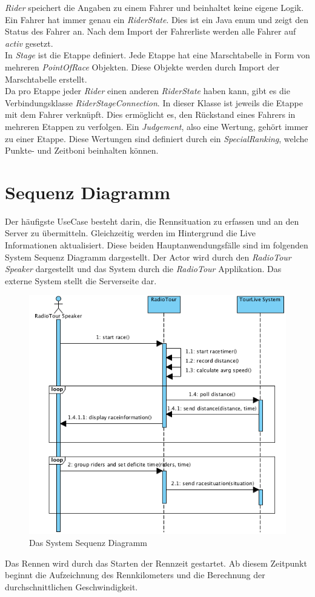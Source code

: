\textit{Rider} speichert die Angaben zu einem Fahrer und beinhaltet keine eigene Logik. Ein Fahrer hat immer genau ein \textit{RiderState}. Dies ist ein Java \gls{enum} und zeigt den Status des Fahrer an. Nach dem Import der Fahrerliste werden alle Fahrer auf \textit{activ} gesetzt.
\\
In \textit{Stage} ist die Etappe definiert. Jede Etappe hat eine Marschtabelle in Form von mehreren \textit{PointOfRace} Objekten. Diese Objekte werden durch Import der Marschtabelle erstellt.
\\
Da pro Etappe jeder \textit{Rider} einen anderen \textit{RiderState} haben kann, gibt es die Verbindungsklasse \textit{RiderStageConnection}. In dieser Klasse ist jeweils die Etappe mit dem Fahrer verknüpft. Dies ermöglicht es, den Rückstand eines Fahrers in mehreren Etappen zu verfolgen.
Ein \textit{Judgement}, also eine Wertung, gehört immer zu einer Etappe. Diese Wertungen sind definiert durch ein \textit{SpecialRanking}, welche Punkte- und Zeitboni beinhalten können.

\section{Sequenz Diagramm}
Der häufigste UseCase besteht darin, die Rennsituation zu erfassen und an den Server zu übermitteln. Gleichzeitig werden im Hintergrund die Live Informationen aktualisiert. Diese beiden Hauptanwendungsfälle sind im folgenden System Sequenz Diagramm dargestellt. Der Actor wird durch den \textit{RadioTour Speaker} dargestellt und das System durch die \textit{RadioTour} Applikation. Das externe System stellt die Serverseite dar.

\begin{figure}[h!]
\caption{Das System Sequenz Diagramm}
\label{fig:ssd_rennen}
\centering
\includegraphics{05bericht/images/ssd_rennen.png}
\end{figure} 

Das Rennen wird durch das Starten der Rennzeit gestartet. Ab diesem Zeitpunkt beginnt die Aufzeichnung des Rennkilometers und die Berechnung der durchschnittlichen Geschwindigkeit.